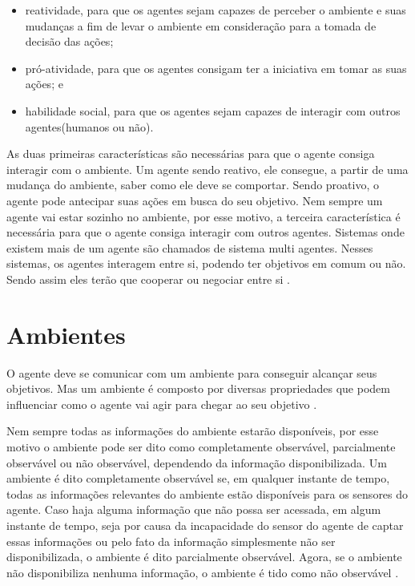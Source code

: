 \begin{itemize}
	\item reatividade, para que os agentes sejam capazes de perceber o ambiente e suas mudanças a fim de levar o ambiente em consideração para a tomada de decisão das ações;
	\item pró-atividade, para que os agentes consigam ter a iniciativa em tomar as suas ações; e
	\item habilidade social, para que os agentes sejam capazes de interagir com outros agentes(humanos ou não).
\end{itemize}

As duas primeiras características são necessárias para que o agente consiga interagir com o ambiente. Um agente sendo reativo, ele consegue, a partir de uma mudança do ambiente, saber como ele deve se comportar. Sendo proativo, o agente pode antecipar suas ações em busca do seu objetivo.
Nem sempre um agente vai estar sozinho no ambiente, por esse motivo, a terceira característica é necessária para que o agente consiga interagir com outros agentes. Sistemas onde existem mais de um agente são chamados de sistema multi agentes. Nesses sistemas, os agentes interagem entre si, podendo ter objetivos em comum ou não. Sendo assim eles terão que cooperar ou negociar entre si \cite{intelligence2003modern}.

\section{Ambientes}

O agente deve se comunicar com um ambiente para conseguir alcançar seus objetivos. Mas um ambiente é composto por diversas propriedades que podem influenciar como o agente vai agir para chegar ao seu objetivo \cite{intelligence2003modern}. 

Nem sempre todas as informações do ambiente estarão disponíveis, por esse motivo o ambiente pode ser dito como completamente observável, parcialmente observável ou não observável, dependendo da informação disponibilizada. Um ambiente é dito completamente observável se, em qualquer instante de tempo, todas as informações relevantes do ambiente estão disponíveis para os sensores do agente. Caso haja alguma informação que não possa ser acessada, em algum instante de tempo, seja por causa da incapacidade do sensor do agente de captar essas informações ou pelo fato da informação simplesmente não ser disponibilizada, o ambiente é dito parcialmente observável. Agora, se o ambiente não disponibiliza nenhuma informação, o ambiente é tido como não observável \cite{ intelligence2003modern, agent1999}.   

